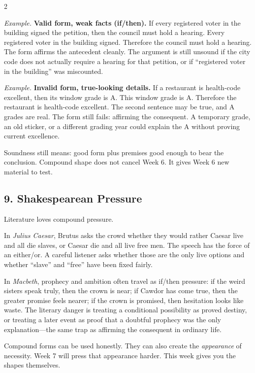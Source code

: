 \documentclass[12pt]{article}
\newcommand{\exbox}[1]{\par\vspace{0.2em}\noindent\textit{Example.} #1\par\vspace{0.15em}}
\begin{document}
\begin{multicols}{2}
\exbox{\textbf{Valid form, weak facts (if/then).} If every registered voter in the building signed the petition, then the council must hold a hearing. Every registered voter in the building signed. Therefore the council must hold a hearing. The form affirms the antecedent cleanly. The argument is still unsound if the city code does not actually require a hearing for that petition, or if ``registered voter in the building'' was miscounted.}

\exbox{\textbf{Invalid form, true-looking details.} If a restaurant is health-code excellent, then its window grade is A. This window grade is A. Therefore the restaurant is health-code excellent. The second sentence may be true, and A grades are real. The form still fails: affirming the consequent. A temporary grade, an old sticker, or a different grading year could explain the A without proving current excellence.}

Soundness still means: good form plus premises good enough to bear the conclusion. Compound shape does not cancel Week 6. It gives Week 6 new material to test.

\subsection*{9. Shakespearean Pressure}
Literature loves compound pressure.

In \textit{Julius Caesar}, Brutus asks the crowd whether they would rather Caesar live and all die slaves, or Caesar die and all live free men. The speech has the force of an either/or. A careful listener asks whether those are the only live options and whether ``slave'' and ``free'' have been fixed fairly.

In \textit{Macbeth}, prophecy and ambition often travel as if/then pressure: if the weird sisters speak truly, then the crown is near; if Cawdor has come true, then the greater promise feels nearer; if the crown is promised, then hesitation looks like waste. The literary danger is treating a conditional possibility as proved destiny, or treating a later event as proof that a doubtful prophecy was the only explanation---the same trap as affirming the consequent in ordinary life.

Compound forms can be used honestly. They can also create the \textit{appearance} of necessity. Week 7 will press that appearance harder. This week gives you the shapes themselves.


\end{multicols}
\end{document}
